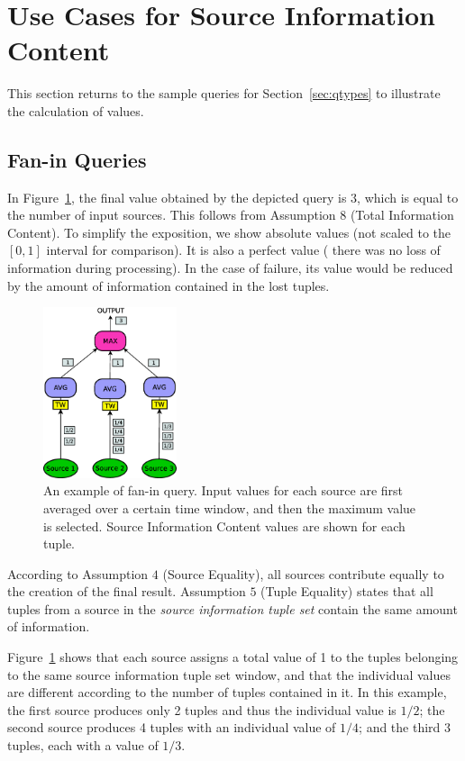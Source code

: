 \section{Use Cases for Source Information Content}
\label{sec:apps}

This section returns to the sample queries for Section~\ref{sec:qtypes} to illustrate the
calculation of \sic values.
\vspace{-10pt}
\subsection*{Fan-in Queries}

In Figure~\ref{fig:query_fanin2}, the final \sic value obtained by the depicted query is $3$, which is
equal to the number of input sources.
This follows from Assumption $8$ (Total Information Content). To simplify the exposition, we show
absolute values (\ie not scaled to the $[0,1]$ interval for comparison). It is also a perfect value (\ie
there was no loss of information during processing). In the case of failure, its value
would be reduced by the amount of information contained in the lost tuples.\\
\begin{figure}[h!] \centering \includegraphics[width=0.35\textwidth]{img/tesi/query_fanin} \caption{An
example of fan-in query. Input values for each source are first averaged over a certain time window, and
then the maximum value is selected. Source Information Content values are shown for each tuple.}
	\label{fig:query_fanin2}
\end{figure}

According to Assumption $4$ (Source Equality), all sources contribute equally to the creation of the
final result.
Assumption $5$ (Tuple Equality) states that all tuples from a source in the \textit{source
information tuple set} contain the same amount of information. 

Figure~\ref{fig:query_fanin2} shows that
each source assigns a total value of 1 to the tuples belonging to the same source information tuple set window, and
that the individual \sic values are different according to the number of tuples contained in it. In this
example, the first source produces only 2 tuples and thus the individual \sic value is $1/2$; the second
source produces 4 tuples with an individual value of $1/4$; and the third 3 tuples, each with a value of
$1/3$.

